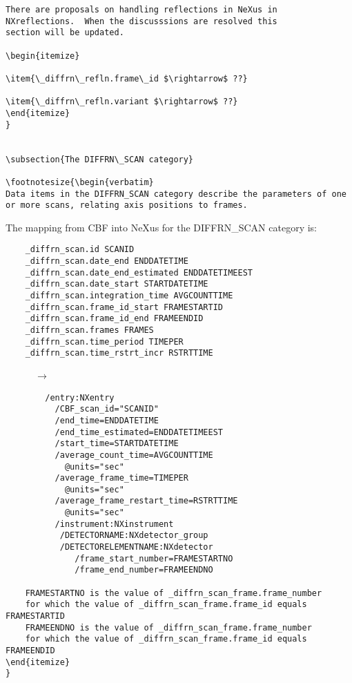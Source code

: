 \documentclass[11pt]{article}
\begin{document}
{{{\begin{verbatim}
There are proposals on handling reflections in NeXus in
NXreflections.  When the discusssions are resolved this
section will be updated.
   
\begin{itemize}

\item{\_diffrn\_refln.frame\_id $\rightarrow$ ??}

\item{\_diffrn\_refln.variant $\rightarrow$ ??}
\end{itemize}
}


\subsection{The DIFFRN\_SCAN category}

\footnotesize{\begin{verbatim}
Data items in the DIFFRN_SCAN category describe the parameters of one
or more scans, relating axis positions to frames.
\end{verbatim}

The mapping from CBF into NeXus for the DIFFRN\_SCAN category is:

\begin{verbatim}     
    _diffrn_scan.id SCANID
    _diffrn_scan.date_end ENDDATETIME
    _diffrn_scan.date_end_estimated ENDDATETIMEEST
    _diffrn_scan.date_start STARTDATETIME
    _diffrn_scan.integration_time AVGCOUNTTIME
    _diffrn_scan.frame_id_start FRAMESTARTID
    _diffrn_scan.frame_id_end FRAMEENDID
    _diffrn_scan.frames FRAMES
    _diffrn_scan.time_period TIMEPER
    _diffrn_scan.time_rstrt_incr RSTRTTIME
\end{verbatim}
~~~~~~{\bf{}$\rightarrow$}\\
\begin{verbatim}
        /entry:NXentry
          /CBF_scan_id="SCANID"
          /end_time=ENDDATETIME
          /end_time_estimated=ENDDATETIMEEST
          /start_time=STARTDATETIME
          /average_count_time=AVGCOUNTTIME
            @units="sec"
          /average_frame_time=TIMEPER
            @units="sec"
          /average_frame_restart_time=RSTRTTIME
            @units="sec"
          /instrument:NXinstrument
           /DETECTORNAME:NXdetector_group
           /DETECTORELEMENTNAME:NXdetector
              /frame_start_number=FRAMESTARTNO
              /frame_end_number=FRAMEENDNO

    FRAMESTARTNO is the value of _diffrn_scan_frame.frame_number
    for which the value of _diffrn_scan_frame.frame_id equals FRAMESTARTID
    FRAMEENDNO is the value of _diffrn_scan_frame.frame_number
    for which the value of _diffrn_scan_frame.frame_id equals FRAMEENDID   
\end{itemize}
}



\end{verbatim}}}}
\end{document}
